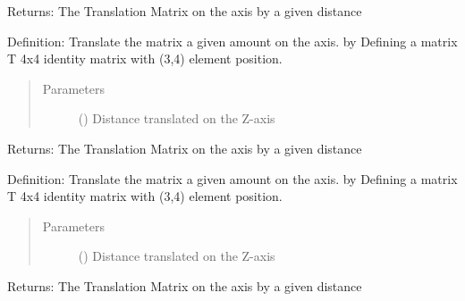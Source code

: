 \documentclass[letterpaper,10pt,english,openany,oneside]{sphinxmanual}
\begin{document}
\begin{fulllineitems}
\begin{fulllineitems}
Returns: The Translation Matrix on the  axis by a given distance

\end{fulllineitems}


\begin{fulllineitems}
\label{\detokenize{MatrixManipulationSymbolic:MatrixManipulationSymbolic.MatrixSymbolic.trans_y}}
Definition: Translate the matrix a given amount  on the  axis. by Defining a matrix T 4x4 identity
matrix with  (3,4) element position.
\begin{quote}\begin{description}
\item[{Parameters}] \leavevmode
{} () \textendash{} Distance translated on the Z-axis

\end{description}\end{quote}

Returns: The Translation Matrix on the  axis by a given distance

\end{fulllineitems}


\begin{fulllineitems}
\label{\detokenize{MatrixManipulationSymbolic:MatrixManipulationSymbolic.MatrixSymbolic.trans_z}}
Definition: Translate the matrix a given amount  on the  axis. by Defining a matrix T 4x4 identity
matrix with  (3,4) element position.
\begin{quote}\begin{description}
\item[{Parameters}] \leavevmode
{} () \textendash{} Distance translated on the Z-axis

\end{description}\end{quote}

Returns: The Translation Matrix on the  axis by a given distance

\end{fulllineitems}


\end{fulllineitems}
\end{document}
